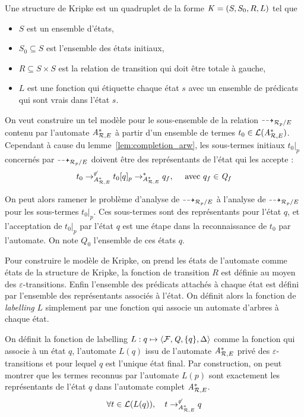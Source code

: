 \begin{definition}
Une structure de Kripke est un quadruplet de la forme $\mathit K = (S, S_0, R, L)$ tel que
\begin{itemize}
\item $S$ est un ensemble d'états,
\item $S_0 \subseteq S$ est l'ensemble des états initiaux,
\item $R \subseteq S \times S$ est la relation de transition qui doit être totale à gauche,
\item $L$ est une fonction qui étiquette chaque état $s$ avec un ensemble de prédicats qui sont vrais 
  dans l'état $s$.
\end{itemize}
\end{definition}

On veut construire un tel modèle pour le sous-ensemble de la relation $\dashrightarrow_{\mathcal R_p/E}$ contenu par l'automate ${\mathit A}_{\mathcal R,E}^*$
à partir d'un ensemble de termes $t_0 \in \mathcal{L}({\mathit A}_{\mathcal R,E}^*)$. Cependant à cause du lemme~\ref{lem:completion_arw}, les sous-termes
initiaux $t_0|_p$  concernés par $\dashrightarrow_{\mathcal R_p/E}$ doivent être des représentants de l'état qui les accepte :
\begin{equation*}
  \label{eq:1}
  t_0 \rightarrow^{\not\varepsilon}_{{\mathit A}_{\mathcal R,E}^*} t_0[q]_p \rightarrow_{{\mathit A}_{\mathcal R,E}^*}^* q_f,\quad \textrm{ avec } q_f \in \mathit Q_f
\end{equation*}

On peut alors ramener le problème d'analyse de $\dashrightarrow_{\mathcal R_p/E}$ à l'analyse de $\dashrightarrow_{\mathcal R_p/E}$ pour les sous-termes $t_0|_p$.
Ces sous-termes sont des représentants pour l'état $q$, et l'acceptation de $t_0|_p$ par l'état $q$ est une étape dans la
reconnaissance de $t_0$ par l'automate. On note $Q_0$ l'ensemble de ces états $q$.

Pour construire le modèle de Kripke, on prend les états de l'automate comme états de la structure de Kripke, 
la fonction de transition $R$ est définie au moyen des $\varepsilon$-transitions.
Enfin l'ensemble des prédicats attachés à  chaque état est défini par l'ensemble des représentants associés à l'état. 
On définit alors la fonction de \textit{labelling} $L$ simplement par une fonction qui associe un automate d'arbres à chaque état.

\begin{definition}
  On définit la fonction de labelling $L : q \mapsto \langle \mathcal{F}, \mathit Q, \{q\}, \Delta\rangle$ comme la fonction
  qui associe à un état $q$, l'automate $L(q)$ issu de l'automate ${\mathit A}_{\mathcal R,E}^*$ privé des $\varepsilon$-transitions
  et pour lequel $q$ est l'unique état final.
  Par construction, on peut montrer que les termes reconnus par l'automate $L(p)$ sont exactement les représentants
  de l'état $q$ dans l'automate complet ${\mathit A}_{\mathcal R,E}^*$.
  \[\forall t \in \mathcal{L}(L(q)), \quad t \rightarrow^{\not\varepsilon}_{{\mathit A}_{\mathcal R,E}^*} q\]
\end{definition}

